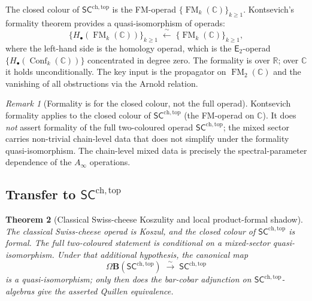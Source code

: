 \documentclass[11pt,reqno]{amsart}
\newtheorem{theorem}{Theorem}[section]
\theoremstyle{definition}
\theoremstyle{remark}
\newtheorem{remark}[theorem]{Remark}
\newcommand{\CC}{\mathbb{C}}
\newcommand{\RR}{\mathbb{R}}
\newcommand{\Ainf}{A_{\infty}}
\newcommand{\Etwo}{\mathsf{E}_{2}}
\newcommand{\SCchtop}{\mathsf{SC}^{\mathrm{ch,top}}}
\DeclareMathOperator{\Conf}{Conf}
\DeclareMathOperator{\FM}{FM}
\numberwithin{equation}{section}
\begin{document}
The closed colour of $\SCchtop$ is the FM-operad
$\{\FM_k(\CC)\}_{k \geq 1}$.  Kontsevich's formality theorem
\cite{Kon99,Kon03} provides a quasi-isomorphism of operads:
\begin{equation}\label{eq:kontsevich-formality}
  \{H_\bullet(\FM_k(\CC))\}_{k \geq 1}
  \;\xleftarrow{\;\sim\;}\;
  \{\FM_k(\CC)\}_{k \geq 1},
\end{equation}
where the left-hand side is the homology operad, which is the
$\Etwo$-operad $\{H_\bullet(\Conf_k(\CC))\}$ concentrated in
degree zero.  The formality is over $\RR$; over $\CC$ it holds
unconditionally.  The key input is the propagator on $\FM_2(\CC)$
and the vanishing of all obstructions via the Arnold relation.

\begin{remark}[Formality is for the closed colour, not the
  full operad]\label{rem:formality-scope}
Kontsevich formality applies to the closed colour of $\SCchtop$
(the FM-operad on $\CC$).  It does \emph{not} assert formality
of the full two-coloured operad $\SCchtop$; the mixed sector
carries non-trivial chain-level data that does not simplify under
the formality quasi-isomorphism.  The chain-level mixed data is
precisely the spectral-parameter dependence of the $\Ainf$
operations.
\end{remark}

\subsection{Transfer to $\SCchtop$}

\begin{theorem}[Classical Swiss-cheese Koszulity and local product-formal shadow]
\label{thm:homotopy-koszul-SC}
\ClaimStatusConditional{}
The classical Swiss-cheese operad is Koszul, and the closed colour of
$\SCchtop$ is formal. The full two-coloured statement is conditional
on a mixed-sector quasi-isomorphism. Under that additional hypothesis,
the canonical map
\begin{equation}\label{eq:bar-cobar-SC}
  \Omega\mathbf{B}(\SCchtop)
  \;\xrightarrow{\;\sim\;}\;
  \SCchtop
\end{equation}
is a quasi-isomorphism; only then does the bar-cobar adjunction on
$\SCchtop$-algebras give the asserted Quillen equivalence.
\end{theorem}
\end{document}
